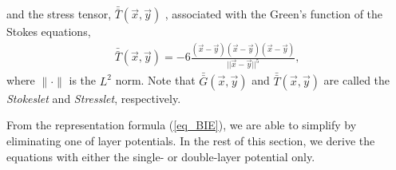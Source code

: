   and the stress tensor, $\bar{\bar{T}}(\vec{x},\vec{y})$ , associated with the Green's function of the Stokes equations,
  \begin{align}
  \bar{\bar{T}}(\vec{x},\vec{y}) = 
  -6\frac{(\vec{x}-\vec{y})(\vec{x}-\vec{y}) (\vec{x}-\vec{y})}{||\vec{x}-\vec{y}||^5},
  \label{eq_stresslet}
  \end{align}
where $\| \cdot \|$ is the $L^2$ norm. 
Note that $ \bar{\bar{G}}(\vec{x},\vec{y})$ and $ \bar{\bar{T}}(\vec{x},\vec{y}) $ are called  the {\textit{Stokeslet}} and {\textit{Stresslet}}, respectively.
\par
From the representation formula (\ref{eq_BIE}), we are able to simplify by eliminating one of layer potentials. 
In the rest of this section, we derive the equations with either the single- or double-layer potential only. 
